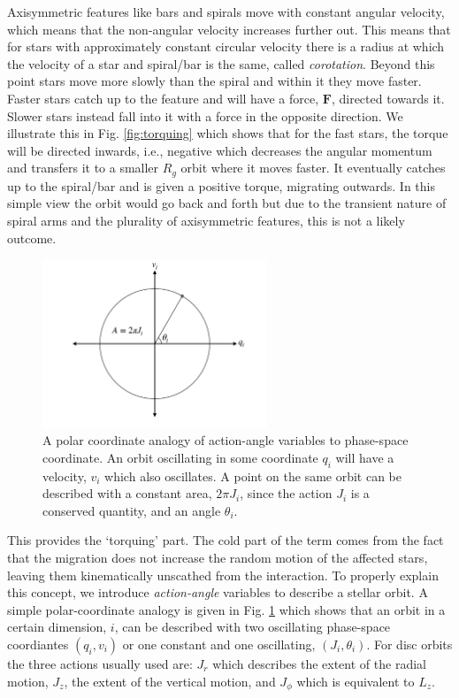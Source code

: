 Axisymmetric features like bars and spirals move with constant angular velocity, which means that the non-angular velocity increases further out. This means that for stars with approximately constant circular velocity there is a radius at which the velocity of a star and spiral/bar is the same, called \textit{corotation}. Beyond this point stars move more slowly than the spiral and within it they move faster. Faster stars catch up to the feature and will have a force, $\bm{F}$, directed towards it. Slower stars instead fall into it with a force in the opposite direction. We illustrate this in Fig. \ref{fig:torquing} which shows that for the fast stars, the torque will be directed inwards, i.e., negative which decreases the angular momentum and transfers it to a smaller $R_g$ orbit where it moves faster. It eventually catches up to the spiral/bar and is given a positive torque, migrating outwards. In this simple view the orbit would go back and forth but due to the transient nature of spiral arms and the plurality of axisymmetric features, this is not a likely outcome.

\begin{figure}[t]
    \centering
    \includegraphics[width=0.6\textwidth]{images/actionangle.pdf}
    \caption{A polar coordinate analogy of action-angle variables to phase-space coordinate. An orbit oscillating in some coordinate $q_i$ will have a velocity, $v_i$ which also oscillates. A point on the same orbit can be described with a constant area, $2\pi J_i$, since the action $J_i$ is a conserved quantity, and an angle $\theta_i$.} %
    \label{fig:actionangle}
\end{figure}

This provides the `torquing' part. The cold part of the term comes from the fact that the migration does not increase the random motion of the affected stars, leaving them kinematically unscathed from the interaction. To properly explain this concept, we introduce \textit{action-angle} variables to describe a stellar orbit. A simple polar-coordinate analogy is given in Fig. \ref{fig:actionangle} which shows that an orbit in a certain dimension, $i$, can be described with two oscillating phase-space coordiantes $(q_i, v_i)$ or one constant and one oscillating, $(J_i, \theta_i)$. For disc orbits the three actions usually used are: $J_r$ which describes the extent of the radial motion, $J_z$, the extent of the vertical motion, and $J_\phi$ which is equivalent to $L_z$. 

